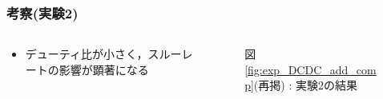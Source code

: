\documentclass[mathsans]{beamer} %
\begin{document}
\begin{frame}
  \frametitle{考察(実験2)}
  \begin{columns}
    \begin{column}{.45\linewidth}
      \begin{itemize}
        \item デューティ比が小さく，スルーレートの影響が顕著になる
      \end{itemize}
    \end{column}
    \begin{column}{.5\linewidth}

      \begin{figure}[htbp]
        \begin{center}
          \vspace{-1em}
          {図 \ref{fig:exp_DCDC_add_comp}(再掲) : 実験2の結果}
        \end{center}
      \end{figure}
    \end{column}
  \end{columns}
\end{frame}
\end{document}
